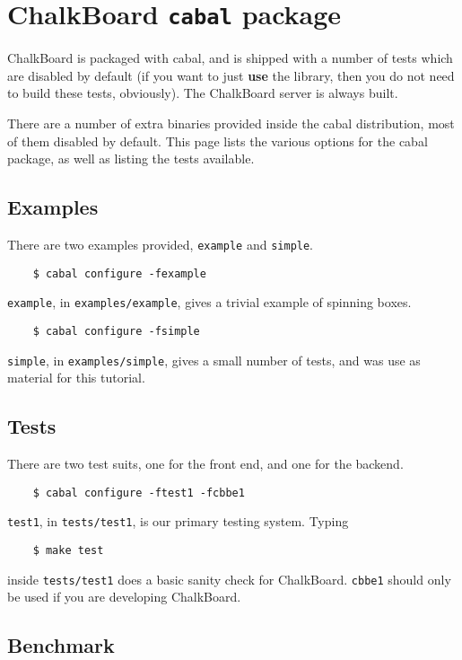 \documentclass{article}
\begin{document}
\newpage
\section{ChalkBoard \texttt{cabal} package}\label{sec:cabal}

ChalkBoard is packaged with cabal, and is shipped with a number of
tests which are disabled by default (if you want to just {\bf use\/} the
library, then you do not need to build these tests, obviously).
The ChalkBoard server is always built.

There are a number of extra binaries provided inside the cabal distribution,
most of them disabled by default.
This page lists the various options for the cabal package,
as well as listing the tests available.

\subsection{Examples}

There are two examples provided, \verb|example| and \verb|simple|.
\begin{verbatim}
    $ cabal configure -fexample
\end{verbatim}
\verb|example|, in \verb|examples/example|, gives a trivial example 
of spinning boxes.
\begin{verbatim}
    $ cabal configure -fsimple
\end{verbatim}

\verb|simple|, in \verb|examples/simple|, gives a small number of tests,
and was use as material for this tutorial.

\subsection{Tests}

There are two test suits, one for the front end, and one for the backend.
\begin{verbatim}
    $ cabal configure -ftest1 -fcbbe1
\end{verbatim}
\verb|test1|, in \verb|tests/test1|, is our primary testing system. 
Typing 
\begin{verbatim}
    $ make test
\end{verbatim}
inside \verb|tests/test1| does a basic sanity check for ChalkBoard.
\verb|cbbe1| should only be used if you are developing ChalkBoard.

\subsection{Benchmark}
\end{document}
